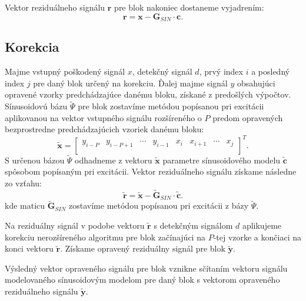 Vektor reziduálneho signálu $\mathbf{r}$ pre blok nakoniec dostaneme vyjadrením:
$$\mathbf{r} = \mathbf{x} - \mathbf{G}_{SIN} \cdot \mathbf{c}.$$

\subsection{Korekcia}
Majme vstupný poškodený signál $x$, detekčný signál $d$, prvý index $i$ a posledný index $j$ pre daný blok určený na korekciu. Ďalej majme signál $y$ obsahujúci opravené vzorky predchádzajúce danému bloku, získané z predošlých výpočtov. Sínusoidovú bázu $\tilde{\Psi}$ pre blok zostavíme metódou popísanou pri excitácii aplikovanou na vektor vstupného signálu rozšíreného o $P$ predom opravených bezprostredne predchádzajúcich vzoriek danému bloku:
$$\mathbf{\tilde{x}} =\begin{bmatrix} 
  y_{i-P} & y_{i-P+1} & \cdots & y_{i-1} & x_{i} & x_{i+1} &\cdots & x_{j}\\
\end{bmatrix}^T.$$
S určenou bázou $\tilde{\Psi}$ odhadneme z vektoru $\mathbf{\tilde{x}}$ parametre sínusoidového modelu $\mathbf{\tilde{c}}$ spôsobom popísaným pri excitácii. Vektor reziduálneho signálu získame následne zo vzťahu:
$$\mathbf{\tilde{r}} = \mathbf{\tilde{x}} - \mathbf{\tilde{G}}_{SIN} \cdot \mathbf{\tilde{c}}.$$
kde maticu $\mathbf{\tilde{G}}_{SIN}$ zostavíme metódou popísanou pri excitácii z bázy $\tilde{\Psi}$. 

Na reziduálny signál v podobe vektoru $\mathbf{\tilde{r}}$ s detekčným signálom $d$ aplikujeme korekciu nerozšíreného algoritmu pre blok začínajúci na $P$-tej vzorke a končiaci na konci vektoru $\mathbf{\tilde{r}}$. Získame opravený reziduálny signál pre blok $\mathbf{\tilde{y}}$. 

Výsledný vektor opraveného signálu pre blok vznikne sčítaním vektoru signálu modelovaného sínusoidovým modelom pre daný blok s vektorom opraveného reziduálneho signálu $\mathbf{\tilde{y}}$.


